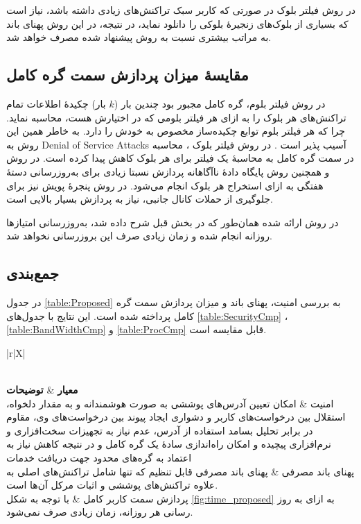 در روش فیلتر بلوک \cite{Osuntokun2017} در صورتی که کاربر سبک تراکنش‌های زیادی داشته باشد، نیاز است که بسیاری از بلوک‌های زنجیرهٔ بلوکی را دانلود نماید، در نتیجه، در این روش پهنای باند به مراتب بیشتری نسبت به روش پیشنهاد شده مصرف خواهد شد.

\subsection{مقایسهٔ میزان پردازش سمت گره کامل }
در روش‌ فیلتر بلوم\cite{Hearn2013}، گره کامل مجبور بود چندین بار ($k$ بار) چکیدهٔ اطلاعات تمام تراکنش‌های هر بلوک را به ازای هر فیلتر بلومی که در اختیارش هست، محاسبه نماید. چرا که هر فیلتر بلوم توابع چکیده‌ساز مخصوص به خودش را دارد. به خاطر همین این روش به
\glspl{Denial of Service Attack}
آسیب پذیر است \cite{PeterTodd}.
در روش فیلتر بلوک \cite{Osuntokun2017}، محاسبه در سمت گره کامل به محاسبهٔ یک فیلتر برای هر بلوک کاهش پیدا کرده است. در روش \cite{Qin2019} و همچنین روش پایگاه دادهٔ ناآگاهانه \cite{Matetic2019} پردازش نسبتا زیادی برای به‌روزرسانی دستهٔ هفتگی به ازای استخراج هر بلوک انجام می‌شود. در روش پنجرهٔ پویش \cite{Matetic2019} نیز برای جلوگیری از حملات کانال جانبی، نیاز به پردازش بسیار بالایی است.

در روش ارائه شده همان‌طور که در بخش قبل شرح داده شد، به‌روزرسانی امتیازها روزانه انجام شده و زمان زیادی صرف این بروزرسانی نخواهد شد.

\subsection{جمع‌بندی}
در جدول \ref{table:Proposed} به بررسی امنیت، پهنای باند و میزان پردازش سمت گره کامل پرداخته شده است. این نتایج با جدول‌های \ref{table:SecurityCmp} ،\ref{table:BandWidthCmp} و \ref{table:ProcCmp} قابل مقایسه است.

\begin{xltabular}{\textwidth}{|r|X|}
	\caption{
		بررسی  امنیت، پهنای باند و پردازش سمت گره کامل برای روش ارائه شده
		\label{table:Proposed}}\\
	\hline
	\textbf{معیار} & \textbf{توضیحات} \\
	\hline
	{%
		امنیت
	}&{%
		امکان تعیین آدرس‌های پوششی به صورت هوشمندانه و به مقدار دلخواه، استقلال بین درخواست‌های کاربر و دشواری ایجاد پیوند بین درخواست‌های وی، مقاوم در برابر تحلیل بسامد استفاده از آدرس، عدم نیاز به تجهیزات سخت‌افزاری و نرم‌افزاری پیچیده و امکان راه‌اندازی ساده‌ٔ یک گره کامل و در نتیجه کاهش نیاز به اعتماد به گره‌های محدود جهت دریافت خدمات
	}\\
	\hline
	{%
		پهنای باند مصرفی
	}&{%
		پهنای باند مصرفی قابل تنظیم که تنها شامل تراکنش‌های اصلی به علاوه تراکنش‌های پوششی و اثبات مرکل آن‌ها است.
	}\\
	\hline
	{%
		پردازش سمت کاربر کامل
	} & {%
		با توجه به شکل \ref{fig:time_proposed} به ازای به روز رسانی هر روزانه، زمان زیادی صرف نمی‌شود.
	}\\
	\hline
	
\end{xltabular}





